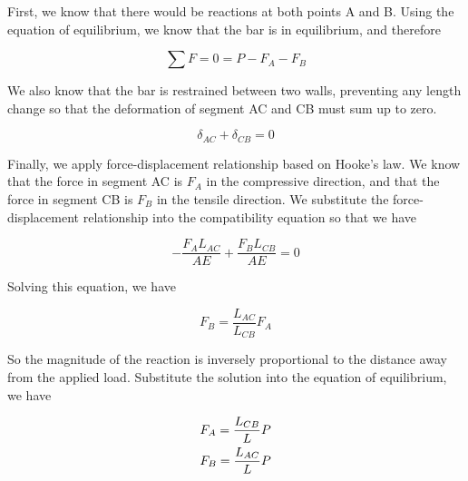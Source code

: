 \documentclass[
10pt,
a4paper,
openany,
svgnames,
]{book} %
\begin{document}
\begin{solution}
First, we know that there would be reactions at both points A and B. Using the equation of equilibrium, we know that the bar is in equilibrium, and therefore

\[\sum F  = 0 = P - {F_A} - {F_B}\]

We also know that the bar is restrained between two walls, preventing any length change so that the deformation of segment AC and CB must sum up to zero.

\[{\delta _{AC}} + {\delta _{CB}} = 0\]

Finally, we apply force-displacement relationship based on Hooke’s law. We know that the force in segment AC is $F_A$ in the compressive direction, and that the force in segment CB is $F_B$ in the tensile direction. We substitute the force-displacement relationship into the compatibility equation so that we have

\[ - \frac{{{F_A}{L_{AC}}}}{{AE}} + \frac{{{F_B}{L_{CB}}}}{{AE}} = 0\]	

Solving this equation, we have

\[{F_B} = \frac{{{L_{AC}}}}{{{L_{CB}}}}{F_A}\]	

So the magnitude of the reaction is inversely proportional to the distance away from the applied load. Substitute the solution into the equation of equilibrium, we have

\[\begin{gathered}
  {F_A} = \frac{{{L_{CB}}}}{L}P \hfill \\
  {F_B} = \frac{{{L_{AC}}}}{L}P \hfill \\ 
\end{gathered} \]
\end{solution}
\end{document}

